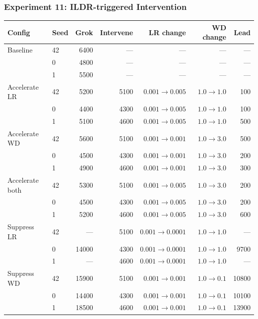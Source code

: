 \documentclass{article}
\begin{document}
\subsubsection{Experiment 11: ILDR-triggered Intervention} 
\begin{table}[H]
\centering


\begin{tabular}{llrrrrr}
\hline
Config & Seed & Grok & Intervene & LR change & WD change & Lead \\
\hline
Baseline        & 42 & 6400  & ---  & ---                   & ---              & --- \\
                & 0  & 4800  & ---  & ---                   & ---              & --- \\
                & 1  & 5500  & ---  & ---                   & ---              & --- \\
\hline
Accelerate LR   & 42 & 5200  & 5100 & $0.001 \to 0.005$     & $1.0 \to 1.0$    & 100 \\
                & 0  & 4400  & 4300 & $0.001 \to 0.005$     & $1.0 \to 1.0$    & 100 \\
                & 1  & 5100  & 4600 & $0.001 \to 0.005$     & $1.0 \to 1.0$    & 500 \\
\hline
Accelerate WD   & 42 & 5600  & 5100 & $0.001 \to 0.001$     & $1.0 \to 3.0$    & 500 \\
                & 0  & 4500  & 4300 & $0.001 \to 0.001$     & $1.0 \to 3.0$    & 200 \\
                & 1  & 4900  & 4600 & $0.001 \to 0.001$     & $1.0 \to 3.0$    & 300 \\
\hline
Accelerate both & 42 & 5300  & 5100 & $0.001 \to 0.005$     & $1.0 \to 3.0$    & 200 \\
                & 0  & 4500  & 4300 & $0.001 \to 0.005$     & $1.0 \to 3.0$    & 200 \\
                & 1  & 5200  & 4600 & $0.001 \to 0.005$     & $1.0 \to 3.0$    & 600 \\
\hline
Suppress LR     & 42 & ---   & 5100 & $0.001 \to 0.0001$    & $1.0 \to 1.0$    & --- \\
                & 0  & 14000 & 4300 & $0.001 \to 0.0001$    & $1.0 \to 1.0$    & 9700 \\
                & 1  & ---   & 4600 & $0.001 \to 0.0001$    & $1.0 \to 1.0$    & --- \\
\hline
Suppress WD     & 42 & 15900 & 5100 & $0.001 \to 0.001$     & $1.0 \to 0.1$    & 10800 \\
                & 0  & 14400 & 4300 & $0.001 \to 0.001$     & $1.0 \to 0.1$    & 10100 \\
                & 1  & 18500 & 4600 & $0.001 \to 0.001$     & $1.0 \to 0.1$    & 13900 \\
\hline
\end{tabular}


\end{table}
\end{document}

